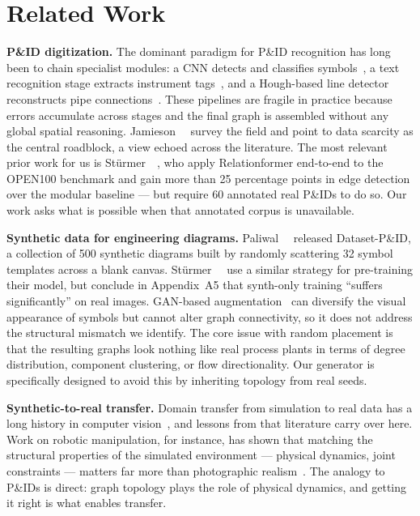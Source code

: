 \section{Related Work}
\label{sec:related}

\noindent\textbf{P\&ID digitization.}
The dominant paradigm for P\&ID recognition has long been to chain
specialist modules: a CNN detects and classifies symbols~\cite{rahul2019,
mani2020,cha2019}, a text recognition stage extracts instrument
tags~\cite{baek2019craft}, and a Hough-based line detector reconstructs
pipe connections~\cite{stuermer2023}.
These pipelines are fragile in practice because errors accumulate
across stages and the final graph is assembled without any global
spatial reasoning.
Jamieson~\etal~\cite{jamieson2024} survey the field and point to
data scarcity as the central roadblock, a view echoed across the literature.
The most relevant prior work for us is Stürmer~\etal~\cite{sturmer2025},
who apply Relationformer end-to-end to the OPEN100 benchmark and gain
more than 25 percentage points in edge detection over the modular
baseline --- but require 60 annotated real P\&IDs to do so.
Our work asks what is possible when that annotated corpus is unavailable.

\noindent\textbf{Synthetic data for engineering diagrams.}
Paliwal~\etal~\cite{paliwal2021} released Dataset-P\&ID, a collection
of 500 synthetic diagrams built by randomly scattering 32 symbol templates
across a blank canvas.
Stürmer~\etal~\cite{sturmer2025} use a similar strategy for pre-training
their model, but conclude in Appendix~A5 that synth-only training
``suffers significantly'' on real images.
GAN-based augmentation~\cite{nurminen2020,elyan2020} can diversify the
visual appearance of symbols but cannot alter graph connectivity,
so it does not address the structural mismatch we identify.
The core issue with random placement is that the resulting graphs look
nothing like real process plants in terms of degree distribution,
component clustering, or flow directionality.
Our generator is specifically designed to avoid this by inheriting
topology from real seeds.

\noindent\textbf{Synthetic-to-real transfer.}
Domain transfer from simulation to real data has a long history in
computer vision~\cite{tobin2017,ganin2016}, and lessons from that
literature carry over here.
Work on robotic manipulation, for instance, has shown that matching the
structural properties of the simulated environment --- physical dynamics,
joint constraints --- matters far more than photographic
realism~\cite{akkaya2019}.
The analogy to P\&IDs is direct: graph topology plays the role of
physical dynamics, and getting it right is what enables transfer.

